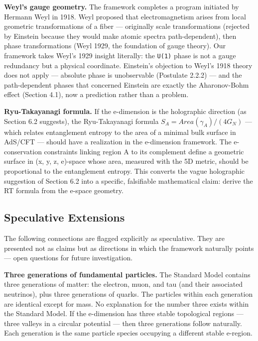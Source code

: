 \documentclass[aps,prd,preprint,superscriptaddress,longbibliography,floatfix]{revtex4-2}
\theoremstyle{remark}
\begin{document}
\textbf{Weyl's gauge geometry.} The framework completes a program initiated by Hermann Weyl in 1918. Weyl proposed that electromagnetism arises from local geometric transformations of a fiber --- originally scale transformations (rejected by Einstein because they would make atomic spectra path-dependent), then phase transformations (Weyl 1929, the foundation of gauge theory). Our framework takes Weyl's 1929 insight literally: the \texttt{U(1)} phase is not a gauge redundancy but a physical coordinate. Einstein's objection to Weyl's 1918 theory does not apply --- absolute phase is unobservable (Postulate 2.2.2) --- and the path-dependent phases that concerned Einstein are exactly the Aharonov-Bohm effect (Section 4.1), now a prediction rather than a problem.

\textbf{Ryu-Takayanagi formula.} If the e-dimension is the holographic direction (as Section 6.2 suggests), the Ryu-Takayanagi formula $S_A = Area(\gamma_A)/(4G_N)$ --- which relates entanglement entropy to the area of a minimal bulk surface in AdS/CFT \cite{RyuTakayanagi2006} --- should have a realization in the e-dimension framework. The e-conservation constraints linking region A to its complement define a geometric surface in (x, y, z, e)-space whose area, measured with the 5D metric, should be proportional to the entanglement entropy. This converts the vague holographic suggestion of Section 6.2 into a specific, falsifiable mathematical claim: derive the RT formula from the e-space geometry.



\subsection{Speculative Extensions}

The following connections are flagged explicitly as speculative. They are presented not as claims but as directions in which the framework naturally points --- open questions for future investigation.

\textbf{Three generations of fundamental particles.} The Standard Model contains three generations of matter: the electron, muon, and tau (and their associated neutrinos), plus three generations of quarks. The particles within each generation are identical except for mass. No explanation for the number three exists within the Standard Model. If the e-dimension has three stable topological regions --- three valleys in a circular potential --- then three generations follow naturally. Each generation is the same particle species occupying a different stable e-region.
\end{document}
